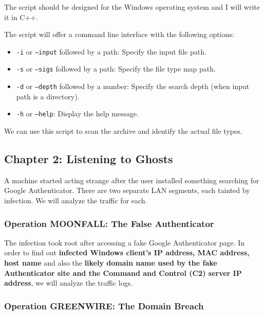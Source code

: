 \documentclass[pdflatex,sn-mathphys-num]{sn-jnl}
\begin{document}
\par The script should be designed for the Windows operating system and I will write it in C++.

\par The script will offer a command line interface with the following options:

\begin{itemize}
    \item \texttt{-i} or \texttt{--input} followed by a path: Specify the input file path.
    \item \texttt{-s} or \texttt{--sigs} followed by a path: Specify the file type map path.
    \item \texttt{-d} or \texttt{--depth} followed by a number: Specify the search depth (when input path is a directory).
    \item \texttt{-h} or \texttt{--help}: Display the help message.
\end{itemize}

\par We can use this script to scan the archive and identify the actual file types.

\subsection{Chapter 2: Listening to Ghosts}

\par A machine started acting strange after the user installed something searching for Google Authenticator.
There are two separate LAN segments, each tainted by infection. We will analyze the traffic for each.

\subsubsection{Operation MOONFALL\@: The False Authenticator}

\par The infection took root after accessing a fake Google Authenticator page. In order to find out \textbf{infected Windows
client's IP address, MAC address, host name} and also the \textbf{likely domain name used by the fake Authenticator site and
the Command and Control (C2) server IP address}, we will analyze the traffic logs.

\subsubsection{Operation GREENWIRE\@: The Domain Breach}
\end{document}
